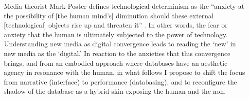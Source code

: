 Media theorist Mark Poster defines technological determinism as the ``anxiety at the possibility of [the human mind's] diminution should these external [technological] objects rise up and threaten it'' \parencite[X]{Pos11:Int}. In other words, the fear or anxiety that the human is ultimately subjected to the power of technology. Understanding new media as digital convergence leads to reading the `new' in new media as the `digital.' In reaction to the anxieties that this convergence brings, and from an embodied approach where databases have an aesthetic agency in resonance with the human, in what follows I propose to shift the focus from narrative (interface) to performance (databasing), and to reconfigure the shadow of the database as a hybrid skin exposing the human and the non. 

